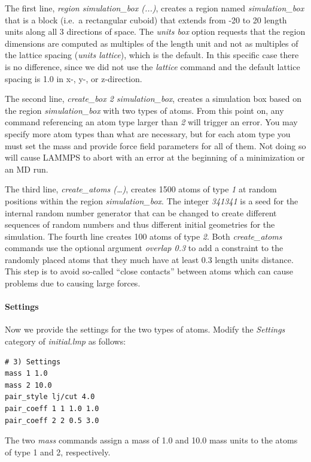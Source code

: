 \documentclass[9pt,tutorial]{livecoms}
\begin{document}
The first line, \textit{region simulation\_box (...)}, creates a region
named \textit{simulation\_box} that is a block (i.e.~a rectangular
cuboid) that extends from -20 to 20 length units along all 3 directions
of space.  The \textit{units box} option requests that the region
dimensions are computed as multiples of the length unit and not as
multiples of the lattice spacing (\textit{units lattice}), which is the
default.  In this specific case there is no difference, since we did not
use the \textit{lattice} command and the default lattice spacing is 1.0
in x-, y-, or z-direction.

The second line, \textit{create\_box 2 simulation\_box}, creates a
simulation box based on the region \textit{simulation\_box} with two
types of atoms.  From this point on, any command referencing an atom
type larger than \textit{2} will trigger an error.  You may specify more
atom types than what are necessary, but for each atom type you must set
the mass and provide force field parameters for all of them. Not doing
so will cause LAMMPS to abort with an error at the beginning of a
minimization or an MD run.

The third line, \textit{create\_atoms (\dots)}, creates 1500 atoms of type
\textit{1} at random positions within the region
\textit{simulation\_box}.  The integer \textit{341341} is a seed for the
internal random number generator that can be changed to create different
sequences of random numbers and thus different initial geometries for
the simulation.  The fourth line creates 100 atoms of type \textit{2}.
Both \textit{create\_atoms} commands use the optional argument
\textit{overlap 0.3} to add a constraint to the randomly placed atoms
that they much have at least 0.3 length units distance.  This step is to
avoid so-called ``close contacts'' between atoms which can cause
problems due to causing large forces.

\paragraph{Settings}
Now we provide the settings for the two types of atoms.  Modify the
\textit{Settings} category of \textit{initial.lmp} as follows:
{\normalsize
\begin{verbatim}
# 3) Settings
mass 1 1.0
mass 2 10.0
pair_style lj/cut 4.0
pair_coeff 1 1 1.0 1.0
pair_coeff 2 2 0.5 3.0
\end{verbatim}
}

The two \textit{mass} commands assign a mass of 1.0 and 10.0 mass units
to the atoms of type 1 and 2, respectively.
\end{document}
